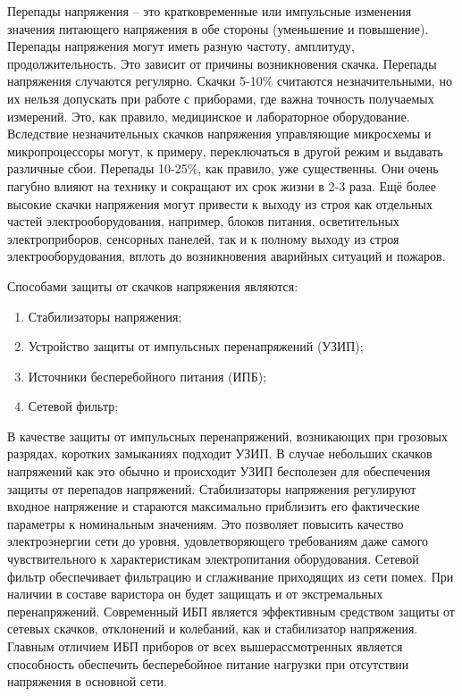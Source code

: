 Перепады напряжения – это кратковременные
или импульсные изменения значения питающего напряжения в обе стороны (уменьшение и
повышение). Перепады напряжения могут иметь разную частоту, амплитуду,
продолжительность. Это зависит от причины возникновения скачка. Перепады напряжения
случаются регулярно. Скачки 5-10\% считаются незначительными, но их нельзя допускать
при работе с приборами, где важна точность получаемых измерений. Это, как правило,
медицинское и лабораторное оборудование. Вследствие незначительных скачков
напряжения управляющие микросхемы и микропроцессоры могут, к примеру,
переключаться в другой режим и выдавать различные сбои. Перепады 10-25\%, как правило,
уже существенны. Они очень пагубно влияют на технику и сокращают их срок жизни в 2-3
раза. Ещё более высокие скачки напряжения могут привести к выходу из строя как
отдельных частей электрооборудования, например, блоков питания, осветительных
электроприборов, сенсорных панелей, так и к полному выходу из строя
электрооборудования, вплоть до возникновения аварийных ситуаций и пожаров. 

Способами защиты от скачков напряжения являются:
\begin{enumerate}
    \item Стабилизаторы напряжения;
    \item Устройство защиты от импульсных перенапряжений (УЗИП);
    \item Источники бесперебойного питания (ИПБ);
    \item Сетевой фильтр;
\end{enumerate}

В качестве защиты от импульсных перенапряжений, возникающих при грозовых разрядах, 
коротких замыканиях подходит УЗИП. В случае небольших скачков
напряжений как это обычно и происходит УЗИП бесполезен для обеспечения защиты от перепадов 
напряжений. Стабилизаторы напряжения
регулируют входное напряжение и стараются максимально приблизить его фактические параметры 
к номинальным значениям. Это позволяет
повысить качество электроэнергии сети до уровня, удовлетворяющего требованиям даже самого 
чувствительного к характеристикам электропитания оборудования.
Сетевой фильтр обеспечивает фильтрацию и сглаживание приходящих из сети помех. При наличии 
в составе варистора он будет защищать и от экстремальных перенапряжений. 
Современный ИБП является эффективным средством защиты от сетевых скачков, отклонений и 
колебаний, как и стабилизатор напряжения.
Главным отличием ИБП приборов от всех вышерассмотренных является способность обеспечить 
бесперебойное питание нагрузки при отсутствии напряжения в основной сети. 

